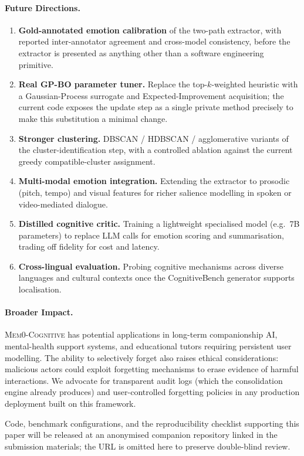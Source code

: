 \paragraph{Future Directions.}
\begin{enumerate}
    \item \textbf{Gold-annotated emotion calibration} of the two-path extractor, with reported inter-annotator agreement and cross-model consistency, before the extractor is presented as anything other than a software engineering primitive.
    \item \textbf{Real GP-BO parameter tuner.} Replace the top-$k$-weighted heuristic with a Gaussian-Process surrogate and Expected-Improvement acquisition; the current code exposes the update step as a single private method precisely to make this substitution a minimal change.
    \item \textbf{Stronger clustering.} DBSCAN / HDBSCAN / agglomerative variants of the cluster-identification step, with a controlled ablation against the current greedy compatible-cluster assignment.
    \item \textbf{Multi-modal emotion integration.} Extending the extractor to prosodic (pitch, tempo) and visual features for richer salience modelling in spoken or video-mediated dialogue.
    \item \textbf{Distilled cognitive critic.} Training a lightweight specialised model (e.g.\ 7B parameters) to replace LLM calls for emotion scoring and summarisation, trading off fidelity for cost and latency.
    \item \textbf{Cross-lingual evaluation.} Probing cognitive mechanisms across diverse languages and cultural contexts once the CognitiveBench generator supports localisation.
\end{enumerate}

\paragraph{Broader Impact.} \textsc{Mem0-Cognitive} has potential applications in long-term companionship AI, mental-health support systems, and educational tutors requiring persistent user modelling. The ability to selectively forget also raises ethical considerations: malicious actors could exploit forgetting mechanisms to erase evidence of harmful interactions. We advocate for transparent audit logs (which the consolidation engine already produces) and user-controlled forgetting policies in any production deployment built on this framework.

Code, benchmark configurations, and the reproducibility checklist supporting this paper will be released at an anonymised companion repository linked in the submission materials; the URL is omitted here to preserve double-blind review.
